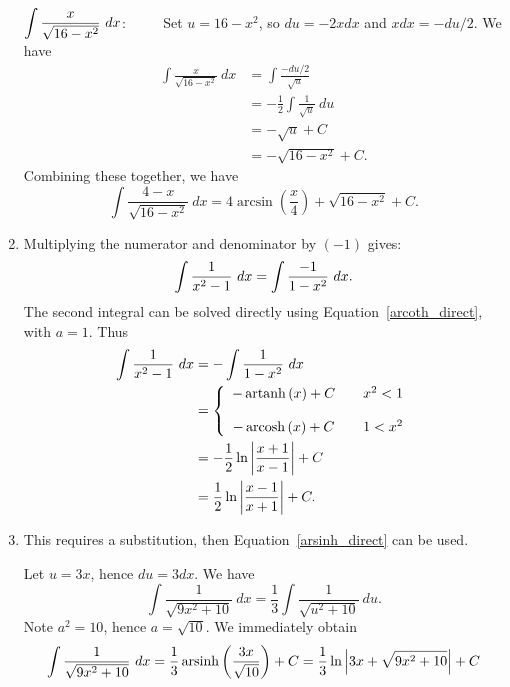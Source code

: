 \begin{example}
\begin{enumerate}
$\displaystyle \int\frac{x}{\sqrt{16-x^2}}\ dx$: $\qquad$ Set $u = 16-x^2$, so $du = -2xdx$ and $xdx = -du/2$. We have 
\begin{align*}
\int\frac{x}{\sqrt{16-x^2}}\ dx &= \int\frac{-du/2}{\sqrt{u}}\\[0.2cm]
				&= -\frac12\int \frac{1}{\sqrt{u}}\ du \\[0.2cm]
				&= - \sqrt{u} + C\\[0.2cm]
				&= -\sqrt{16-x^2} + C.
\end{align*}
Combining these together, we have 
$$ \int \frac{4-x}{\sqrt{16-x^2}}\ dx = 4\arcsin \left(\frac x4 \right) + \sqrt{16-x^2}+C.$$
\ifanalysis
\item 		Multiplying the numerator and denominator by $(-1)$ gives: 
$$\displaystyle \int \frac{1}{x^2-1}\ dx = \int \frac{-1}{1-x^2}\ dx.$$
The second integral can be solved directly using Equation~\eqref{arcoth_direct}, with $a=1$. Thus
\begin{align}
\int \frac{1}{x^2-1}\ dx &= -\int \frac{1}{1-x^2}\ dx \notag \\
		&= \left\{\begin{array}{ccc} -\operatorname{artanh}\left(x\right)+C & & x^2<1 \\ \\
-\operatorname{arcosh}\left(x\right)+C & & 1<x^2 \end{array}\right. \notag\\
     &=-\frac12\ln\left|\frac{x+1}{x-1}\right|+C\notag\\
     &=\frac12\ln\left|\frac{x-1}{x+1}\right|+C.\label{eq:hf3}
     \end{align}
\item		This requires a substitution, then Equation~\eqref{arsinh_direct} can be used.

Let $u = 3x$, hence $du = 3dx$. We have 
$$
\int \frac{1}{\sqrt{9x^2+10}}\ dx = \frac13\int\frac{1}{\sqrt{u^2+10}}\ du. 
$$
Note $a^2=10$, hence $a = \sqrt{10}.$ We immediately obtain 
$$
\int \frac{1}{\sqrt{9x^2+10}}\ dx =\frac13 \operatorname{arsinh}\left(\frac{3x}{\sqrt{10}}\right) + C=\frac13 \ln \Big|3x+\sqrt{9x^2+10}\Big|+C
$$

\fi
\end{enumerate}
\end{example}


